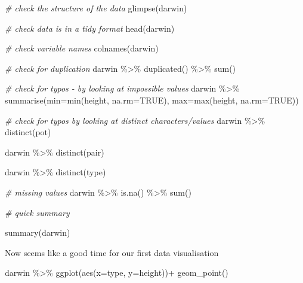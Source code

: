 \documentclass[
]{book}
\newenvironment{Shaded}{\begin{snugshade}}{\end{snugshade}}
\newcommand{\AttributeTok}[1]{\textcolor[rgb]{0.77,0.63,0.00}{#1}}
\newcommand{\CommentTok}[1]{\textcolor[rgb]{0.56,0.35,0.01}{\textit{#1}}}
\newcommand{\ConstantTok}[1]{\textcolor[rgb]{0.00,0.00,0.00}{#1}}
\newcommand{\FunctionTok}[1]{\textcolor[rgb]{0.00,0.00,0.00}{#1}}
\newcommand{\NormalTok}[1]{#1}
\newcommand{\SpecialCharTok}[1]{\textcolor[rgb]{0.00,0.00,0.00}{#1}}
\begin{document}
\begin{Shaded}
\begin{Highlighting}[]
\CommentTok{\# check the structure of the data}
\FunctionTok{glimpse}\NormalTok{(darwin)}

\CommentTok{\# check data is in a tidy format}
\FunctionTok{head}\NormalTok{(darwin)}

\CommentTok{\# check variable names}
\FunctionTok{colnames}\NormalTok{(darwin)}

\CommentTok{\# check for duplication}
\NormalTok{darwin }\SpecialCharTok{\%\textgreater{}\%} 
  \FunctionTok{duplicated}\NormalTok{() }\SpecialCharTok{\%\textgreater{}\%} 
  \FunctionTok{sum}\NormalTok{()}

\CommentTok{\# check for typos {-} by looking at impossible values}
\NormalTok{darwin }\SpecialCharTok{\%\textgreater{}\%} 
  \FunctionTok{summarise}\NormalTok{(}\AttributeTok{min=}\FunctionTok{min}\NormalTok{(height, }\AttributeTok{na.rm=}\ConstantTok{TRUE}\NormalTok{), }
            \AttributeTok{max=}\FunctionTok{max}\NormalTok{(height, }\AttributeTok{na.rm=}\ConstantTok{TRUE}\NormalTok{))}

\CommentTok{\# check for typos by looking at distinct characters/values}
\NormalTok{darwin }\SpecialCharTok{\%\textgreater{}\%} 
  \FunctionTok{distinct}\NormalTok{(pot)}

\NormalTok{darwin }\SpecialCharTok{\%\textgreater{}\%} 
  \FunctionTok{distinct}\NormalTok{(pair)}

\NormalTok{darwin }\SpecialCharTok{\%\textgreater{}\%} 
  \FunctionTok{distinct}\NormalTok{(type)}

\CommentTok{\# missing values}
\NormalTok{darwin }\SpecialCharTok{\%\textgreater{}\%} 
  \FunctionTok{is.na}\NormalTok{() }\SpecialCharTok{\%\textgreater{}\%} 
  \FunctionTok{sum}\NormalTok{()}

\CommentTok{\# quick summary}

\FunctionTok{summary}\NormalTok{(darwin)}
\end{Highlighting}
\end{Shaded}

Now seems like a good time for our first data visualisation

\begin{Shaded}
\begin{Highlighting}[]
\NormalTok{darwin }\SpecialCharTok{\%\textgreater{}\%} 
  \FunctionTok{ggplot}\NormalTok{(}\FunctionTok{aes}\NormalTok{(}\AttributeTok{x=}\NormalTok{type,}
         \AttributeTok{y=}\NormalTok{height))}\SpecialCharTok{+}
  \FunctionTok{geom\_point}\NormalTok{()}
\end{Highlighting}
\end{Shaded}
\end{document}
